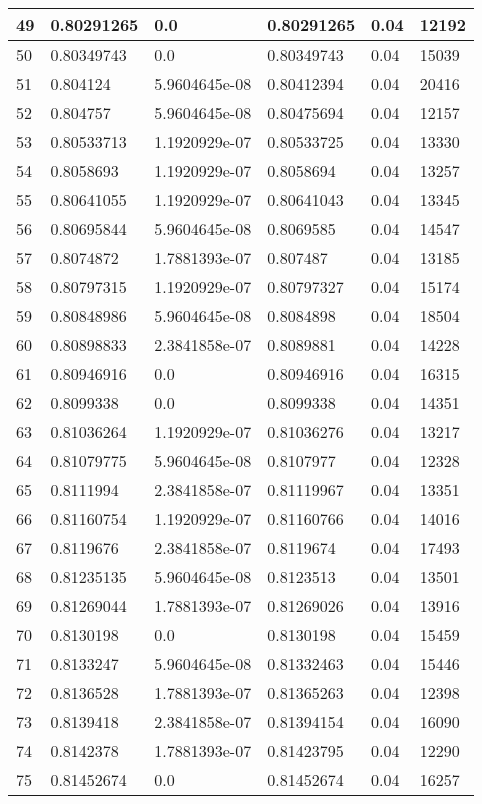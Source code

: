 \begin{longtable}{|l|l|l|l|l|l|}
49 & 0.80291265 & 0.0 & 0.80291265 & 0.04 & 12192 \\ \hline 
50 & 0.80349743 & 0.0 & 0.80349743 & 0.04 & 15039 \\ \hline 
51 & 0.804124 & 5.9604645e-08 & 0.80412394 & 0.04 & 20416 \\ \hline 
52 & 0.804757 & 5.9604645e-08 & 0.80475694 & 0.04 & 12157 \\ \hline 
53 & 0.80533713 & 1.1920929e-07 & 0.80533725 & 0.04 & 13330 \\ \hline 
54 & 0.8058693 & 1.1920929e-07 & 0.8058694 & 0.04 & 13257 \\ \hline 
55 & 0.80641055 & 1.1920929e-07 & 0.80641043 & 0.04 & 13345 \\ \hline 
56 & 0.80695844 & 5.9604645e-08 & 0.8069585 & 0.04 & 14547 \\ \hline 
57 & 0.8074872 & 1.7881393e-07 & 0.807487 & 0.04 & 13185 \\ \hline 
58 & 0.80797315 & 1.1920929e-07 & 0.80797327 & 0.04 & 15174 \\ \hline 
59 & 0.80848986 & 5.9604645e-08 & 0.8084898 & 0.04 & 18504 \\ \hline 
60 & 0.80898833 & 2.3841858e-07 & 0.8089881 & 0.04 & 14228 \\ \hline 
61 & 0.80946916 & 0.0 & 0.80946916 & 0.04 & 16315 \\ \hline 
62 & 0.8099338 & 0.0 & 0.8099338 & 0.04 & 14351 \\ \hline 
63 & 0.81036264 & 1.1920929e-07 & 0.81036276 & 0.04 & 13217 \\ \hline 
64 & 0.81079775 & 5.9604645e-08 & 0.8107977 & 0.04 & 12328 \\ \hline 
65 & 0.8111994 & 2.3841858e-07 & 0.81119967 & 0.04 & 13351 \\ \hline 
66 & 0.81160754 & 1.1920929e-07 & 0.81160766 & 0.04 & 14016 \\ \hline 
67 & 0.8119676 & 2.3841858e-07 & 0.8119674 & 0.04 & 17493 \\ \hline 
68 & 0.81235135 & 5.9604645e-08 & 0.8123513 & 0.04 & 13501 \\ \hline 
69 & 0.81269044 & 1.7881393e-07 & 0.81269026 & 0.04 & 13916 \\ \hline 
70 & 0.8130198 & 0.0 & 0.8130198 & 0.04 & 15459 \\ \hline 
71 & 0.8133247 & 5.9604645e-08 & 0.81332463 & 0.04 & 15446 \\ \hline 
72 & 0.8136528 & 1.7881393e-07 & 0.81365263 & 0.04 & 12398 \\ \hline 
73 & 0.8139418 & 2.3841858e-07 & 0.81394154 & 0.04 & 16090 \\ \hline 
74 & 0.8142378 & 1.7881393e-07 & 0.81423795 & 0.04 & 12290 \\ \hline 
75 & 0.81452674 & 0.0 & 0.81452674 & 0.04 & 16257 \\ \hline 
\end{longtable}